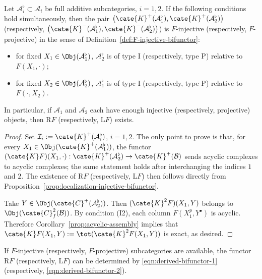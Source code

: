 \begin{lemma}\label{prop:RF-bifunctor}
	Let $\mathcal{A}_i^\flat\subset\mathcal{A}_i$ be full additive
	subcategories, $i=1,2$. If the following conditions hold simultaneously,
	then the pair
	$\bigl(\cate{K}^+(\mathcal{A}_1^\flat),
	\cate{K}^+(\mathcal{A}_2^\flat)\bigr)$ (respectively,
	$\bigl(\cate{K}^-(\mathcal{A}_1^\flat),
	\cate{K}^-(\mathcal{A}_2^\flat)\bigr)$) is $F$-injective (respectively,
	$F$-projective) in the sense of
	Definition~\ref{def:F-injective-bifunctor}:
	\begin{itemize}
		\item for fixed $X_1\in\Obj(\mathcal{A}_1^\flat)$,
		$\mathcal{A}_2^\flat$ is of type I (respectively, type P) relative to
		$F(X_1,\cdot)$;
		\item for fixed $X_2\in\Obj(\mathcal{A}_2^\flat)$,
		$\mathcal{A}_1^\flat$ is of type I (respectively, type P) relative to
		$F(\cdot,X_2)$.
	\end{itemize}
	In particular, if $\mathcal{A}_1$ and $\mathcal{A}_2$ each have enough
	injective (respectively, projective) objects, then $\mathrm{R}F$
	(respectively, $\mathrm{L}F$) exists.
\end{lemma}
\begin{proof}
	Set $\mathcal{I}_i:=\cate{K}^+(\mathcal{A}_i^\flat)$, $i=1,2$. The only
	point to prove is that, for every
	$X_1\in\Obj(\cate{K}^+(\mathcal{A}_1^\flat))$, the functor
	$(\cate{K}F)(X_1,\cdot):\cate{K}^+(\mathcal{A}_2^\flat)
	\to\cate{K}^+(\mathcal{B})$ sends acyclic complexes to acyclic complexes;
	the same statement holds after interchanging the indices $1$ and $2$. The
	existence of $\mathrm{R}F$ (respectively, $\mathrm{L}F$) then follows
	directly from Proposition~\ref{prop:localization-injective-bifunctor}.

	Take $Y\in\Obj(\cate{C}^+(\mathcal{A}_2^\flat))$. Then
	$(\cate{K}^2F)(X_1,Y)$ belongs to
	$\Obj(\cate{C}^2_f(\mathcal{B}))$. By condition (I2), each column
	$F(X_1^p,Y^\bullet)$ is acyclic. Therefore
	Corollary~\ref{prop:acyclic-assembly} implies that
	$\cate{K}F(X_1,Y):=\tot(\cate{K}^2F(X_1,Y))$ is exact, as desired.
\end{proof}

If $F$-injective (respectively, $F$-projective) subcategories are available,
the functor $\mathrm{R}F$ (respectively, $\mathrm{L}F$) can be determined by
\eqref{eqn:derived-bifunctor-1} (respectively,
\eqref{eqn:derived-bifunctor-2}).
